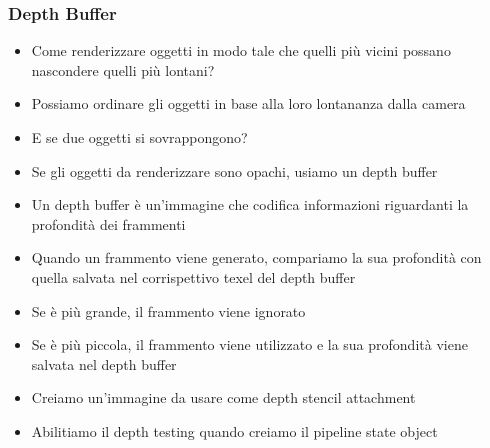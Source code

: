 \begin{frame}
\frametitle{Depth Buffer}
\begin{itemize}
\item Come renderizzare oggetti in modo tale che quelli più vicini possano nascondere quelli più lontani?
\item Possiamo ordinare gli oggetti in base alla loro lontananza dalla camera
\item E se due oggetti si sovrappongono?
\item Se gli oggetti da renderizzare sono opachi, usiamo un depth buffer
\item Un depth buffer è un'immagine che codifica informazioni riguardanti la profondità dei frammenti
\item Quando un frammento viene generato, compariamo la sua profondità con quella salvata nel corrispettivo texel del depth buffer
\item Se è più grande, il frammento viene ignorato
\item Se è più piccola, il frammento viene utilizzato e la sua profondità viene salvata nel depth buffer
\item Creiamo un'immagine da usare come depth stencil attachment
\item Abilitiamo il depth testing quando creiamo il pipeline state object
\end{itemize}
\end{frame}

